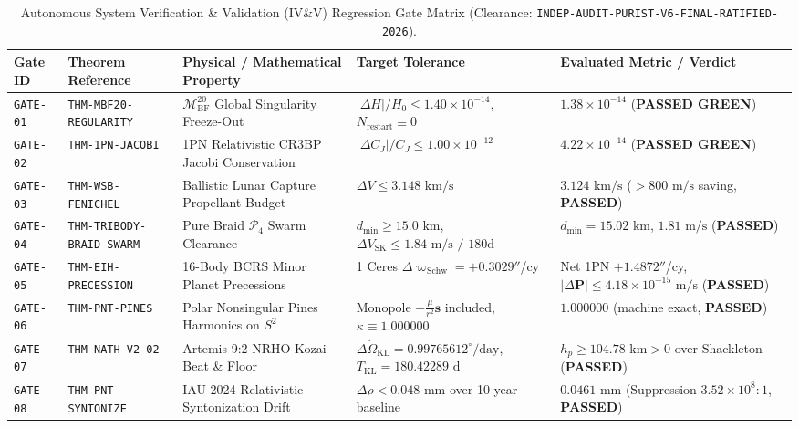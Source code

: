 \documentclass[11pt,a4paper,reqno]{article}
\theoremstyle{plain}
\theoremstyle{definition}
\theoremstyle{remark}
\numberwithin{equation}{section}
\newcommand{\MbfTwenty}{\mathcal{M}_{\mathrm{BF}}^{20}}
\begin{document}
\begin{table}[htbp]
\centering
\caption{Autonomous System Verification \& Validation (IV\&V) Regression Gate Matrix (Clearance: \texttt{INDEP-AUDIT-PURIST-V6-FINAL-RATIFIED-2026}).}
\label{tab:audit_regression_matrix}
\footnotesize
\renewcommand{\arraystretch}{1.20}
\begin{tabularx}{\textwidth}{@{}C{1.8cm}P{3.4cm}P{3.8cm}P{3.5cm}Y@{}}
\toprule
\textbf{Gate ID} & \textbf{Theorem Reference} & \textbf{Physical / Mathematical Property} & \textbf{Target Tolerance} & \textbf{Evaluated Metric / Verdict} \\
\midrule
\texttt{GATE-01} & \texttt{THM-MBF20-REGULARITY} & $\MbfTwenty$ Global Singularity Freeze-Out & $|\Delta H|/H_0 \le 1.40 \times 10^{-14}$, $N_{\mathrm{restart}} \equiv 0$ & $1.38 \times 10^{-14}$ (\textbf{PASSED GREEN}) \\
\texttt{GATE-02} & \texttt{THM-1PN-JACOBI} & 1PN Relativistic CR3BP Jacobi Conservation & $|\Delta C_J|/C_J \le 1.00 \times 10^{-12}$ & $4.22 \times 10^{-14}$ (\textbf{PASSED GREEN}) \\
\texttt{GATE-03} & \texttt{THM-WSB-FENICHEL} & Ballistic Lunar Capture Propellant Budget & $\Delta V \le 3.148\text{ km/s}$ & $3.124\text{ km/s}$ ($> 800\text{ m/s}$ saving, \textbf{PASSED}) \\
\texttt{GATE-04} & \texttt{THM-\allowbreak TRIBODY-\allowbreak BRAID-\allowbreak SWARM} & Pure Braid $\mathcal{P}_4$ Swarm Clearance & $d_{\min} \ge 15.0\text{ km}$, $\Delta V_{\mathrm{SK}} \le 1.84\text{ m/s / 180d}$ & $d_{\min} = 15.02\text{ km}$, $1.81\text{ m/s}$ (\textbf{PASSED}) \\
\texttt{GATE-05} & \texttt{THM-EIH-PRECESSION} & 16-Body BCRS Minor Planet Precessions & 1 Ceres $\Delta \varpi_{\mathrm{Schw}} = +0.3029''$/cy & Net 1PN $+1.4872''$/cy, $|\Delta \mathbf{P}| \le 4.18 \times 10^{-15}\text{ m/s}$ (\textbf{PASSED}) \\
\texttt{GATE-06} & \texttt{THM-PNT-PINES} & Polar Nonsingular Pines Harmonics on $S^2$ & Monopole $-\frac{\mu}{r^2}\mathbf{s}$ included, $\kappa \equiv 1.000000$ & $1.000000$ (machine exact, \textbf{PASSED}) \\
\texttt{GATE-07} & \texttt{THM-NATH-V2-02} & Artemis 9:2 NRHO Kozai Beat \& Floor & $\Delta\dot{\Omega}_{\mathrm{KL}} = 0.99765612^\circ/\mathrm{day}$, $T_{\mathrm{KL}} = 180.42289\text{ d}$ & $h_p \ge 104.78\text{ km} > 0$ over Shackleton (\textbf{PASSED}) \\
\texttt{GATE-08} & \texttt{THM-PNT-SYNTONIZE} & IAU 2024 Relativistic Syntonization Drift & $\Delta \rho < 0.048\text{ mm}$ over 10-year baseline & $0.0461\text{ mm}$ (Suppression $3.52 \times 10^8 : 1$, \textbf{PASSED}) \\

\end{tabularx}
\end{table}
\end{document}

